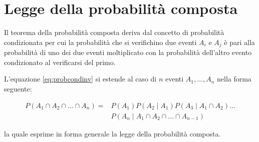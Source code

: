 \documentclass[
  11pt,
]{krantz}
\theoremstyle{definition}
\theoremstyle{definition}
\theoremstyle{definition}
\theoremstyle{definition}
\theoremstyle{remark}
\begin{document}
\hypertarget{legge-della-probabilituxe0-composta}{%
\section{Legge della probabilità composta}\label{legge-della-probabilituxe0-composta}}

Il teorema della probabilità composta deriva dal concetto di probabilità condizionata per cui la probabilità che si verifichino due eventi \(A_i\) e \(A_j\) è pari alla probabilità di uno dei due eventi moltiplicato con la probabilità dell'altro evento condizionato al verificarsi del primo.

L'equazione \eqref{eq:probcondinv} si estende al caso di \(n\) eventi \(A_1, \dots, A_n\) nella forma seguente:

\begin{equation}
\begin{split}
P(A_1 \cap A_2 \cap \dots\cap A_n) = {}& P(A_1)P(A_2 \mid A_1)P(A_3 \mid A_1 \cap A_2) \dots\\
 & P(A_n \mid A_1 \cap A_2 \cap \dots \cap A_{n-1})
\end{split}
\label{eq:probcomposte}
\end{equation}

la quale esprime in forma generale la legge della probabilità composta.
\end{document}
